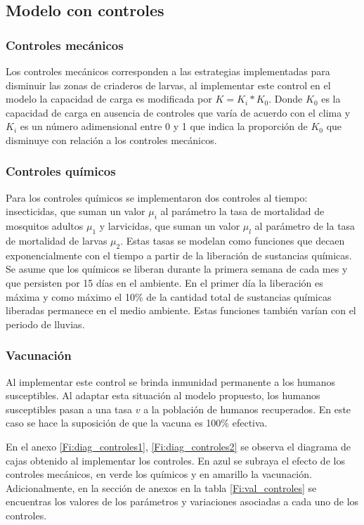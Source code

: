\documentclass[journal]{IEEEtran}
\begin{document}
\subsection{Modelo con controles}

\subsubsection{Controles mecánicos}

Los controles mecánicos corresponden a las estrategias implementadas para disminuir las zonas de criaderos de larvas, al implementar este control en el modelo la capacidad de carga es modificada por $K = K_i * K_0$. Donde $K_0$ es la capacidad de carga en ausencia de controles que varía de acuerdo con el clima y $K_i$ es un número adimensional entre 0 y 1 que indica la proporción de $K_0$ que disminuye con relación a los controles mecánicos.

\subsubsection{Controles químicos}

Para los controles químicos se implementaron dos controles al tiempo: insecticidas, que suman un valor $\mu_i$ al  parámetro la tasa de mortalidad de mosquitos adultos $\mu_1$ y larvicidas, que suman un valor $\mu_l$ al  parámetro de la tasa de mortalidad de larvas $\mu_2$. Estas tasas se modelan como funciones que decaen exponencialmente con el tiempo a partir de la liberación de sustancias químicas. Se asume que los químicos se liberan durante la primera semana de cada mes y que persisten por 15 días en el ambiente. En el primer día la liberación es máxima y como máximo el 10\% de la cantidad total de sustancias químicas liberadas permanece en el medio ambiente. Estas funciones también varían con el periodo de lluvias. 

\subsubsection{Vacunación}

Al implementar este control se brinda inmunidad permanente a los humanos susceptibles. Al adaptar esta situación al modelo propuesto, los humanos susceptibles pasan a una tasa $v$ a la población de humanos recuperados. En este caso se hace la suposición de que la vacuna es 100\% efectiva.

En el anexo \ref{Fi:diag_controles1}, \ref{Fi:diag_controles2} se observa el diagrama de cajas obtenido al implementar los controles. En azul se subraya el efecto de los controles mecánicos, en verde los químicos y en amarillo la vacunación. Adicionalmente, en la sección de anexos en la tabla \ref{Fi:val_controles} se encuentras los valores de los parámetros y variaciones asociadas a cada uno de los controles.
\end{document}
